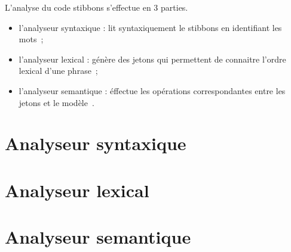 L'analyse du code stibbons s'effectue en 3 parties.

\begin{itemize}
\item l'analyseur syntaxique : lit syntaxiquement le stibbons en identifiant les mots~;
\item l'analyseur lexical : génère des jetons qui permettent de connaitre l'ordre lexical d'une phrase~;
\item l'analyseur semantique : éffectue les opérations correspondantes entre les jetons et le modèle~.
\end{itemize}

\section{Analyseur syntaxique}


\section{Analyseur lexical}


\section{Analyseur semantique}

